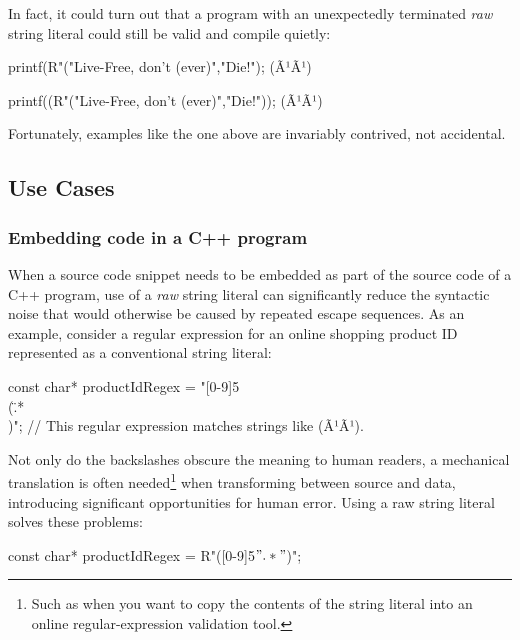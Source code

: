 \noindent In fact, it could turn out that a program with an unexpectedly
terminated \emph{raw} string literal could still be valid and compile
quietly:

\begin{emcppslisting}[language=C++]
printf(R"("Live-Free, don't (ever)","Die!");
    (Ã¹{}Ã¹)

printf((R"("Live-Free, don't (ever)","Die!"));
    (Ã¹{}Ã¹)
\end{emcppslisting}
    
\noindent Fortunately, examples like the one above are invariably contrived, not
accidental.

\subsection[Use Cases]{Use Cases}\label{use-cases}

\subsubsection[Embedding code in a C++ program]{Embedding code in a C++ program}\label{embedding-code-in-a-c++-program}

When a source code snippet needs to be embedded as part of the source
code of a C++ program, use of a \emph{raw} string literal can
significantly reduce the syntactic noise that would otherwise be caused
by repeated escape sequences. As an example, consider a regular
expression for an online shopping product ID represented as a
conventional string literal:

\begin{emcppslisting}[language=C++]
const char* productIdRegex = "[0-9]{5}\\(\".*\"\\)";
    // This regular expression matches strings like (Ã¹{}Ã¹).
\end{emcppslisting}
    
\noindent Not only do the backslashes obscure the meaning to human readers, a
mechanical translation is often needed{\cprotect\footnote{Such as when
you want to copy the contents of the string literal into an online
  regular-expression validation tool.}} when transforming between source
and data, introducing significant opportunities for human error. Using a
raw string literal solves these problems:

\begin{emcppslisting}[language=C++]
const char* productIdRegex = R"([0-9]{5}\(".*"\))";
\end{emcppslisting}
    
